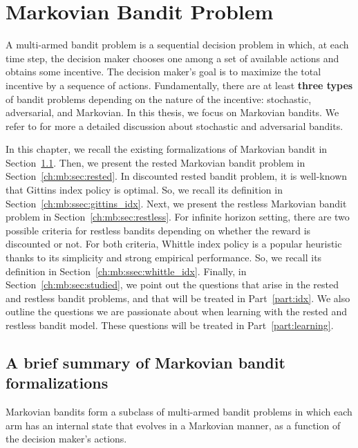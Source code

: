 \begingroup
\let\clearpage\relax

\chapter{Markovian Bandit Problem}
\label{ch:mb}

A multi-armed bandit problem is a sequential decision problem in which, at each time step, the decision maker chooses one among a set of available actions and obtains some incentive.
The decision maker's goal is to maximize the total incentive by a sequence of actions.
Fundamentally, there are at least \textbf{three types} of bandit problems depending on the nature of the incentive: stochastic, adversarial, and Markovian.
In this thesis, we focus on Markovian bandits.
We refer to \cite{bubeck2012regret} for more a detailed discussion about stochastic and adversarial bandits.

In this chapter, we recall the existing formalizations of Markovian bandit in Section~\ref{ch:mb:sec:summary}.
Then, we present the rested Markovian bandit problem in Section~\ref{ch:mb:sec:rested}.
In discounted rested bandit problem, it is well-known that Gittins index policy is optimal.
So, we recall its definition in Section~\ref{ch:mb:ssec:gittins_idx}.
Next, we present the restless Markovian bandit problem in Section~\ref{ch:mb:sec:restless}.
For infinite horizon setting, there are two possible criteria for restless bandits depending on whether the reward is discounted or not.
For both criteria, Whittle index policy is a popular heuristic thanks to its simplicity and strong empirical performance.
So, we recall its definition in Section~\ref{ch:mb:ssec:whittle_idx}.
Finally, in Section~\ref{ch:mb:sec:studied}, we point out the questions that arise in the rested and restless bandit problems, and that will be treated in Part~\ref{part:idx}.
We also outline the questions we are passionate about when learning with the rested and restless bandit model.
These questions will be treated in Part~\ref{part:learning}.

\section{A brief summary of Markovian bandit formalizations}
\label{ch:mb:sec:summary}

Markovian bandits form a subclass of multi-armed bandit problems in which each arm has an internal state that evolves in a Markovian manner, as a function of the decision maker’s actions.

